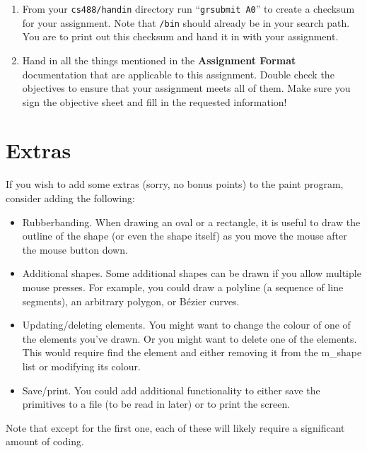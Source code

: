 \begin{enumerate}
    \item
        From your \texttt{cs488/handin} directory
        run ``\texttt{grsubmit A0}'' to create a checksum
        for your assignment.   Note that \texttt{\CourseData/bin} should
        already be in your search path.
        You are to print out this checksum and
        hand it in with your assignment.

    \item
        Hand in all the things mentioned in the {\bf Assignment Format} 
        documentation that are applicable to this assignment.  Double
        check the objectives to ensure that your assignment meets all of them.
        Make sure you sign the objective sheet and fill in the requested 
        information!

\end{enumerate}

\section{Extras}
If you wish to add some extras (sorry, no bonus points) to the
paint program, consider adding the following:
\begin{itemize}
	\item Rubberbanding.  When drawing an oval or a rectangle,
		it is useful to draw the outline of the shape (or
		even the shape itself) as you move the mouse after
		the mouse button down.
	\item Additional shapes.  Some additional shapes can be
		drawn if you allow multiple mouse presses.
		For example, you could draw a polyline (a sequence
		of line segments), an arbitrary polygon, or B\'ezier
		curves.
	\item Updating/deleting elements.  You might want to change
		the colour of one of the elements you've drawn.  Or
		you might want to delete one of the elements.  This
		would require find the element and either removing
		it from the m\_shape list or modifying its colour.
	\item Save/print.  You could add additional functionality
		to either save the primitives to a file (to be
		read in later) or to print the screen.
\end{itemize}
Note that except for the first one, each of these will likely require
a significant amount of coding.

